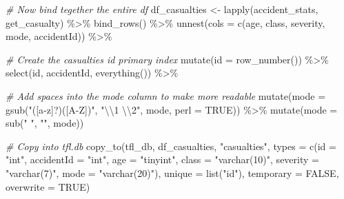\documentclass[
]{article}
\newenvironment{Shaded}{\begin{snugshade}}{\end{snugshade}}
\newcommand{\AttributeTok}[1]{\textcolor[rgb]{0.77,0.63,0.00}{#1}}
\newcommand{\CommentTok}[1]{\textcolor[rgb]{0.56,0.35,0.01}{\textit{#1}}}
\newcommand{\ConstantTok}[1]{\textcolor[rgb]{0.00,0.00,0.00}{#1}}
\newcommand{\FunctionTok}[1]{\textcolor[rgb]{0.00,0.00,0.00}{#1}}
\newcommand{\NormalTok}[1]{#1}
\newcommand{\OtherTok}[1]{\textcolor[rgb]{0.56,0.35,0.01}{#1}}
\newcommand{\SpecialCharTok}[1]{\textcolor[rgb]{0.00,0.00,0.00}{#1}}
\newcommand{\StringTok}[1]{\textcolor[rgb]{0.31,0.60,0.02}{#1}}
\begin{document}
\begin{Shaded}
\begin{Highlighting}[]
  \CommentTok{\# Now bind tegether the entire df}
\NormalTok{  df\_casualties }\OtherTok{\textless{}{-}} \FunctionTok{lapply}\NormalTok{(accident\_stats, get\_casualty) }\SpecialCharTok{\%\textgreater{}\%}
    \FunctionTok{bind\_rows}\NormalTok{() }\SpecialCharTok{\%\textgreater{}\%}
    \FunctionTok{unnest}\NormalTok{(}\AttributeTok{cols =} \FunctionTok{c}\NormalTok{(age, class, severity, mode, accidentId)) }\SpecialCharTok{\%\textgreater{}\%}
    
    \CommentTok{\# Create the casualties id primary index}
    \FunctionTok{mutate}\NormalTok{(}\AttributeTok{id =} \FunctionTok{row\_number}\NormalTok{()) }\SpecialCharTok{\%\textgreater{}\%}
    \FunctionTok{select}\NormalTok{(id, accidentId, }\FunctionTok{everything}\NormalTok{()) }\SpecialCharTok{\%\textgreater{}\%}
    
    \CommentTok{\# Add spaces into the \textasciigrave{}mode\textasciigrave{} column to make more readable}
    \FunctionTok{mutate}\NormalTok{(}\AttributeTok{mode =} \FunctionTok{gsub}\NormalTok{(}\StringTok{"([a{-}z]?)([A{-}Z])"}\NormalTok{, }
                       \StringTok{"}\SpecialCharTok{\textbackslash{}\textbackslash{}}\StringTok{1 }\SpecialCharTok{\textbackslash{}\textbackslash{}}\StringTok{2"}\NormalTok{, }
\NormalTok{                       mode, }
                       \AttributeTok{perl =} \ConstantTok{TRUE}\NormalTok{)) }\SpecialCharTok{\%\textgreater{}\%}
    \FunctionTok{mutate}\NormalTok{(}\AttributeTok{mode =} \FunctionTok{sub}\NormalTok{(}\StringTok{" "}\NormalTok{, }\StringTok{""}\NormalTok{, mode))}
  
  \CommentTok{\# Copy into tfl.db}
  \FunctionTok{copy\_to}\NormalTok{(tfl\_db, df\_casualties, }\StringTok{"casualties"}\NormalTok{,}
          \AttributeTok{types =} \FunctionTok{c}\NormalTok{(}\AttributeTok{id =} \StringTok{"int"}\NormalTok{,}
                    \AttributeTok{accidentId =} \StringTok{"int"}\NormalTok{,}
                    \AttributeTok{age =} \StringTok{"tinyint"}\NormalTok{,}
                    \AttributeTok{class =} \StringTok{"varchar(10)"}\NormalTok{,}
                    \AttributeTok{severity =} \StringTok{"varchar(7)"}\NormalTok{,}
                    \AttributeTok{mode =} \StringTok{"varchar(20)"}\NormalTok{),}
          \AttributeTok{unique =} \FunctionTok{list}\NormalTok{(}\StringTok{"id"}\NormalTok{),}
          \AttributeTok{temporary =} \ConstantTok{FALSE}\NormalTok{, }\AttributeTok{overwrite =} \ConstantTok{TRUE}\NormalTok{)}
\end{Highlighting}
\end{Shaded}
\end{document}
